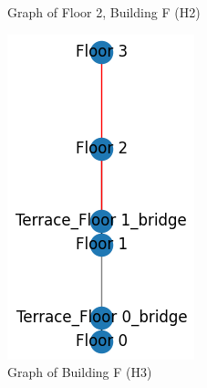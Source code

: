 \begin{figure}[h]
\begin{subfigure}{.6\textwidth}
      \caption{Graph of Floor 2, Building F (H2)}
    \end{subfigure}
    \begin{subfigure}{.2\textwidth}
      \centering
      \includegraphics[width=\textwidth]{figures/40_concept/ltc_graph_building_f.png}
      \caption{Graph of Building F (H3)}
    \end{subfigure}%
    \begin{subfigure}{.8\textwidth}
      \centering

\end{subfigure}
\end{figure}
